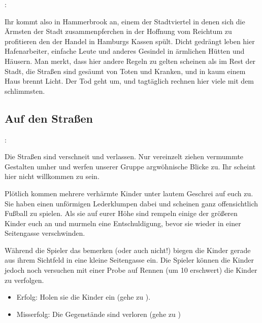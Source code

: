 

:

Ihr kommt also in Hammerbrook an, einem der Stadtviertel in denen sich die Ärmsten der Stadt zusammenpferchen in der Hoffnung vom Reichtum zu profitieren den der Handel in Hamburgs Kassen spült. Dicht gedrängt leben hier Hafenarbeiter, einfache Leute und anderes Gesindel in ärmlichen Hütten und Häusern. Man merkt, dass hier andere Regeln zu gelten scheinen als im Rest der Stadt, die Straßen sind gesäumt von Toten und Kranken, und in kaum einem Haus brennt Licht. Der Tod geht um, und tagtäglich rechnen hier viele mit dem schlimmsten.

\subsection*{Auf den Straßen}
\label{strasse}

:

Die Straßen sind verschneit und verlassen. Nur vereinzelt ziehen vermummte Gestalten umher und werfen unserer Gruppe argwöhnische Blicke zu. Ihr scheint hier nicht willkommen zu sein.

 \blue{\ref{kampf2}}

Plötlich kommen mehrere verhärmte Kinder unter lautem Geschrei auf euch zu. Sie haben einen unförmigen Lederklumpen dabei und scheinen ganz offensichtlich Fußball zu spielen. Als sie auf eurer Höhe sind rempeln einige der größeren Kinder euch an und murmeln eine Entschuldigung, bevor sie wieder in einer Seitengasse verschwinden.


Während die Spieler das bemerken (oder auch nicht!) biegen die Kinder gerade aus ihrem Sichtfeld in eine kleine Seitengasse ein. Die Spieler können die Kinder jedoch noch versuchen mit einer Probe auf Rennen (um 10 erschwert) die Kinder zu verfolgen.

\begin{itemize}
  \item Erfolg: Holen sie die Kinder ein (gehe zu \blue{\ref{eingeholt}}).
  \item Misserfolg: Die Gegenstände sind verloren (gehe zu \blue{\ref{neingeholt}})
\end{itemize}

